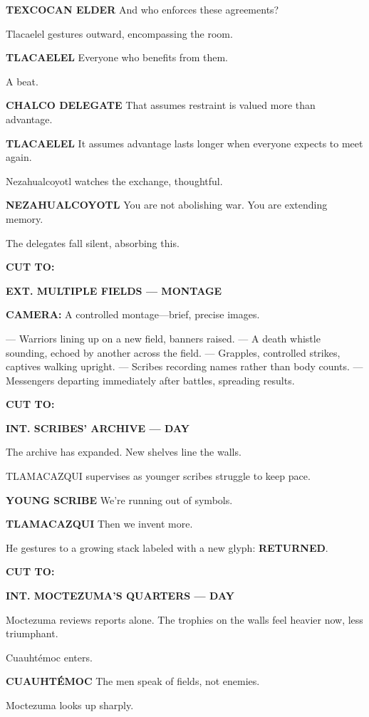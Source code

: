 \documentclass[12pt]{article}
\begin{document}
\textbf{TEXCOCAN ELDER}  
And who enforces these agreements?

Tlacaelel gestures outward, encompassing the room.

\textbf{TLACAELEL}  
Everyone who benefits from them.

A beat.

\textbf{CHALCO DELEGATE}  
That assumes restraint is valued more than advantage.

\textbf{TLACAELEL}  
It assumes advantage lasts longer  
when everyone expects to meet again.

Nezahualcoyotl watches the exchange, thoughtful.

\textbf{NEZAHUALCOYOTL}  
You are not abolishing war.  
You are extending memory.

The delegates fall silent, absorbing this.

\textbf{CUT TO:}

\textbf{EXT. MULTIPLE FIELDS — MONTAGE}

\textbf{CAMERA:} A controlled montage—brief, precise images.

— Warriors lining up on a new field, banners raised.  
— A death whistle sounding, echoed by another across the field.  
— Grapples, controlled strikes, captives walking upright.  
— Scribes recording names rather than body counts.  
— Messengers departing immediately after battles, spreading results.

\textbf{CUT TO:}

\textbf{INT. SCRIBES’ ARCHIVE — DAY}

The archive has expanded. New shelves line the walls.

TLAMACAZQUI supervises as younger scribes struggle to keep pace.

\textbf{YOUNG SCRIBE}  
We’re running out of symbols.

\textbf{TLAMACAZQUI}  
Then we invent more.

He gestures to a growing stack labeled with a new glyph: \textbf{RETURNED}.

\textbf{CUT TO:}

\textbf{INT. MOCTEZUMA’S QUARTERS — DAY}

Moctezuma reviews reports alone. The trophies on the walls feel heavier now, less triumphant.

Cuauhtémoc enters.

\textbf{CUAUHTÉMOC}  
The men speak of fields, not enemies.

Moctezuma looks up sharply.
\end{document}
